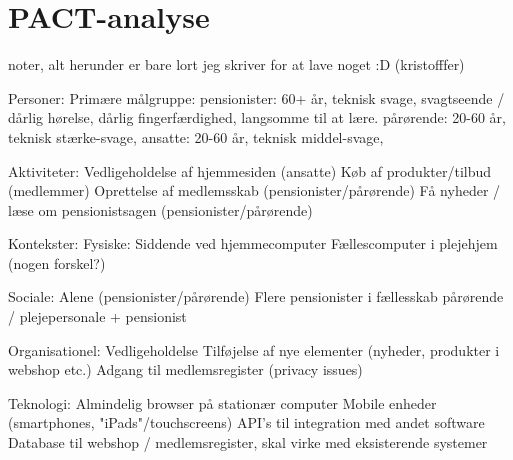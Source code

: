\section{PACT-analyse}
noter, alt herunder er bare lort jeg skriver for at lave noget :D (kristofffer)

Personer:
Primære målgruppe:
pensionister: 60+ år, teknisk svage, svagtseende / dårlig hørelse, dårlig fingerfærdighed, langsomme til at lære.
pårørende: 20-60 år, teknisk stærke-svage,
ansatte: 20-60 år, teknisk middel-svage,


Aktiviteter:
Vedligeholdelse af hjemmesiden (ansatte)
Køb af produkter/tilbud (medlemmer)
Oprettelse af medlemsskab (pensionister/pårørende)
Få nyheder / læse om pensionistsagen (pensionister/pårørende)


Kontekster:
Fysiske:
Siddende ved hjemmecomputer
Fællescomputer i plejehjem (nogen forskel?)

Sociale:
Alene (pensionister/pårørende)
Flere pensionister i fællesskab
pårørende / plejepersonale + pensionist

Organisationel:
Vedligeholdelse
Tilføjelse af nye elementer (nyheder, produkter i webshop etc.)
Adgang til medlemsregister (privacy issues)


Teknologi:
Almindelig browser på stationær computer
Mobile enheder (smartphones, "iPads"/touchscreens)
API's til integration med andet software
Database til webshop / medlemsregister, skal virke med eksisterende systemer
